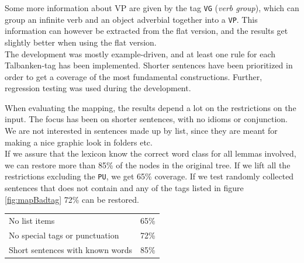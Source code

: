 \documentclass{report}
\begin{document}
Some more information about VP are given by the tag \verb|VG| (\emph{verb group}),
which can group an infinite verb and an object adverbial together into a \verb|VP|.
This information can however be extracted from the flat version, and the results
get slightly better when using the flat version. \\


The development was mostly example-driven, and at least one rule for each
Talbanken-tag has been implemented.
Shorter sentences have been prioritized in order to get a coverage of the most
fundamental constructions. Further,  
regression testing was used during the development. %

When evaluating the mapping, the results depend a lot on the restrictions on the
input. 
The focus has been on shorter sentences, with no idioms or conjunction. We are
not interested in sentences made up by list, since they are meant for making
a nice graphic look in folders etc.\\


If we
assure that the lexicon know the correct word class for all lemmas involved, we
can restore more than 85\% of the nodes in the original tree.
If we lift all the restrictions excluding the \verb|PU|, we get
65\% coverage.
If we test randomly collected sentences that does not contain and any of the tags listed
in figure \ref{fig:mapBadtag} 72\% can be restored. \\

\begin{tabular}{ll}
No list items & 65\%\\
No special tags or punctuation & 72\%\\
Short sentences with known words & 85\%\\
\end{tabular}


\end{document}
